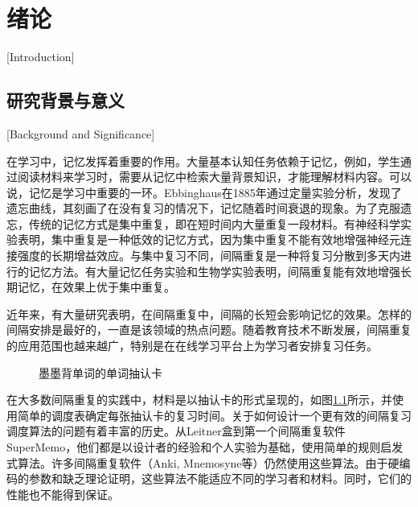 
\chapter{绪论}[Introduction]

\section{研究背景与意义}[Background and Significance]

在学习中，记忆发挥着重要的作用。大量基本认知任务依赖于记忆，例如，学生通过阅读材料来学习时，需要从记忆中检索大量背景知识，才能理解材料内容\cite{reisbergCognitionExploringScience2019}。可以说，记忆是学习中重要的一环。Ebbinghaus在1885年通过定量实验分析，发现了遗忘曲线，其刻画了在没有复习的情况下，记忆随着时间衰退的现象\cite{ebbinghausMemoryContributionExperimental1913}。为了克服遗忘，传统的记忆方式是集中重复，即在短时间内大量重复一段材料。有神经科学实验表明，集中重复是一种低效的记忆方式，因为集中重复不能有效地增强神经元连接强度的长期增益效应\cite{kramarSynapticEvidenceEfficacy2012}。与集中复习不同，间隔重复是一种将复习分散到多天内进行的记忆方法。有大量记忆任务实验\cite{cepedaDistributedPracticeVerbal2006}和生物学实验\cite{smolenRightTimeLearn2016}表明，间隔重复能有效地增强长期记忆，在效果上优于集中重复。

近年来，有大量研究表明，在间隔重复中，间隔的长短会影响记忆的效果\cite{cepedaSpacingEffectsLearning2008,delaneySpacingTestingEffects2010}。怎样的间隔安排是最好的，一直是该领域的热点问题。随着教育技术不断发展，间隔重复的应用范围也越来越广，特别是在在线学习平台上为学习者安排复习任务。

\begin{figure}[htbp]
    \setlength{\subfigcapskip}{-1bp}
    \centering
    \begin{minipage}{\textwidth}
    \centering
    \subfigure{\label{fig:flashcard:front}}\addtocounter{subfigure}{-2}
    \hspace{2em}
    \subfigure{\label{fig:flashcard:back}}\addtocounter{subfigure}{-2}
    \end{minipage}
    \vspace{0.2em}
    \caption{墨墨背单词的单词抽认卡}
    \label{fig:flashcard}
\end{figure}

在大多数间隔重复的实践中，材料是以抽认卡的形式呈现的，如图\ref{fig:flashcard}所示，并使用简单的调度表确定每张抽认卡的复习时间。关于如何设计一个更有效的间隔复习调度算法的问题有着丰富的历史。从Leitner盒到第一个间隔重复软件SuperMemo，他们都是以设计者的经验和个人实验为基础，使用简单的规则启发式算法。许多间隔重复软件（Anki, Mnemosyne等）仍然使用这些算法。由于硬编码的参数和缺乏理论证明，这些算法不能适应不同的学习者和材料。同时，它们的性能也不能得到保证。

